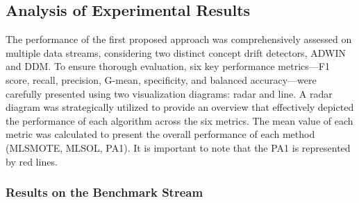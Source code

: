 \subsection{Analysis of Experimental Results}
The performance of the first proposed approach was comprehensively assessed on multiple data streams, considering two distinct concept drift detectors, ADWIN and DDM. To ensure thorough evaluation, six key performance metrics—F1 score, recall, precision, G-mean, specificity, and balanced accuracy—were carefully presented using two visualization diagrams: radar and line. A radar diagram was strategically utilized to provide an overview that effectively depicted the performance of each algorithm across the six metrics. The mean value of each metric was calculated to present the overall performance of each method (MLSMOTE, MLSOL, PA1). It is important to note that the PA1 is represented by red lines.

\subsubsection{Results on the Benchmark Stream}

